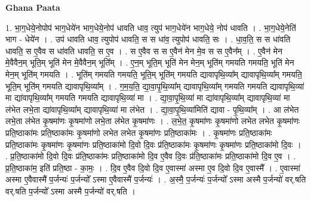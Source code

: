 \documentclass[17pt]{extarticle}
\begin{document}
\textbf{Ghana Paata } \newline

1. भा॒ग॒धेये॒नोपोप॑ भाग॒धेये॑न भाग॒धेये॒नोप॑ धावति धाव॒ त्युप॑ भाग॒धेये॑न भाग॒धेये॒ नोप॑ धावति । . भा॒ग॒धेये॒नेति॑ भाग - धेये॑न । . उप॑ धावति धाव॒ त्युपोप॑ धावति॒ स स धा॑व॒ त्युपोप॑ धावति॒ सः । . धा॒व॒ति॒ स स धा॑वति धावति॒ स ए॒वैव स धा॑वति धावति॒ स ए॒व । . स ए॒वैव स स ए॒वैन॑ मेन मे॒व स स ए॒वैन᳚म् । . ए॒वैन॑ मेन मे॒वैवैन॒म् भूति॒म् भूति॑ मेन मे॒वैवैन॒म् भूति᳚म् । . ए॒न॒म् भूति॒म् भूति॑ मेन मेन॒म् भूति॑म् गमयति गमयति॒ भूति॑ मेन मेन॒म् भूति॑म् गमयति । . भूति॑म् गमयति गमयति॒ भूति॒म् भूति॑म् गमयति द्यावापृथि॒व्या᳚म् द्यावापृथि॒व्या᳚म् गमयति॒ भूति॒म् भूति॑म् गमयति द्यावापृथि॒व्या᳚म् । . ग॒म॒य॒ति॒ द्या॒वा॒पृ॒थि॒व्या᳚म् द्यावापृथि॒व्या᳚म् गमयति गमयति द्यावापृथि॒व्या॑ मा द्या॑वापृथि॒व्या᳚म् गमयति गमयति द्यावापृथि॒व्या॑ मा । . द्या॒वा॒पृ॒थि॒व्या॑ मा द्या॑वापृथि॒व्या᳚म् द्यावापृथि॒व्या॑ मा ल॑भेत लभे॒ता द्या॑वापृथि॒व्या᳚म् द्यावापृथि॒व्या॑ मा ल॑भेत । . द्या॒वा॒पृ॒थि॒व्या॑मिति॑ द्यावा - पृ॒थि॒व्या᳚म् । . आ ल॑भेत लभे॒ता ल॑भेत कृ॒षमा॑णः कृ॒षमा॑णो लभे॒ता ल॑भेत कृ॒षमा॑णः । . ल॒भे॒त॒ कृ॒षमा॑णः कृ॒षमा॑णो लभेत लभेत कृ॒षमा॑णः प्रति॒ष्ठाका॑मः प्रति॒ष्ठाका॑मः कृ॒षमा॑णो लभेत लभेत कृ॒षमा॑णः प्रति॒ष्ठाका॑मः । . कृ॒षमा॑णः प्रति॒ष्ठाका॑मः प्रति॒ष्ठाका॑मः कृ॒षमा॑णः कृ॒षमा॑णः प्रति॒ष्ठाका॑मो दि॒वो दि॒वः प्र॑ति॒ष्ठाका॑मः कृ॒षमा॑णः कृ॒षमा॑णः प्रति॒ष्ठाका॑मो दि॒वः । . प्र॒ति॒ष्ठाका॑मो दि॒वो दि॒वः प्र॑ति॒ष्ठाका॑मः प्रति॒ष्ठाका॑मो दि॒व ए॒वैव दि॒वः प्र॑ति॒ष्ठाका॑मः प्रति॒ष्ठाका॑मो दि॒व ए॒व । . प्र॒ति॒ष्ठाका॑म॒ इति॑ प्रति॒ष्ठा - का॒मः॒ । . दि॒व ए॒वैव दि॒वो दि॒व ए॒वास्मा॑ अस्मा ए॒व दि॒वो दि॒व ए॒वास्मै᳚ । . ए॒वास्मा॑ अस्मा ए॒वैवास्मै॑ प॒र्जन्यः॑ प॒र्जन्यो᳚ ऽस्मा ए॒वैवास्मै॑ प॒र्जन्यः॑ । . अ॒स्मै॒ प॒र्जन्यः॑ प॒र्जन्यो᳚ ऽस्मा अस्मै प॒र्जन्यो॑ वर्.षति वर्.षति प॒र्जन्यो᳚ ऽस्मा अस्मै प॒र्जन्यो॑ वर्.षति । \newline
\end{document}
